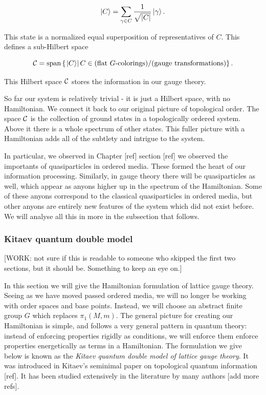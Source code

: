 \documentclass{article}
\theoremstyle{definition}
\numberwithin{figure}{section}
\begin{document}
$$\ket{C}=\sum_{\gamma \in C}\frac{1}{\sqrt{|C|}}\ket{\gamma}.$$

This state is a normalized equal superposition of representatives of $C$. This defines a sub-Hilbert space

$$\mathcal{C}=\text{span}\left\{\left.\ket{C}\right| C\in \text{(flat $G$-colorings)}/\text{(gauge transformations)}\right\}.$$

This Hilbert space $\mathcal{C}$ stores the information in our gauge theory.

So far our system is relatively trivial - it is just a Hilbert space, with no Hamiltonian. We connect it back to our original picture of topological order. The space $\mathcal{C}$ is the collection of ground states in a topologically ordered system. Above it there is a whole spectrum of other states. This fuller picture with a Hamiltonian adds all of the subtlety and intrigue to the system.

In particular, we observed in Chapter [ref] section [ref] we observed the importants of quasiparticles in ordered media. These formed the heart of our information processing. Similarly, in gauge theory there will be quasiparticles as well, which appear as anyons higher up in the spectrum of the Hamiltonian. Some of these anyons correspond to the classical quasiparticles in ordered media, but other anyons are entirely new features of the system which did not exist before. We will analyse all this in more in the subsection that follows.

\subsubsection{Kitaev quantum double model}

[WORK: not sure if this is readable to someone who skipped the first two sections, but it should be. Something to keep an eye on.]

In this section we will give the Hamiltonian formulation of lattice gauge theory. Seeing as we have moved passed ordered media, we will no longer be working with order spaces and base points. Instead, we will choose an abstract finite group $G$ which replaces $\pi_1(M,m)$. The general picture for creating our Hamiltonian is simple, and follows a very general pattern in quantum theory: instead of enforcing properties rigidly as conditions, we will enforce them enforce properties energetically as terms in a Hamiltonian. The formulation we give below is known as the \textit{Kitaev quantum double model of lattice gauge theory}. It was introduced in Kitaev's seminimal paper on topological quantum information [ref]. It has been studied extensively in the literature by many authors [add more refs].
\end{document}
